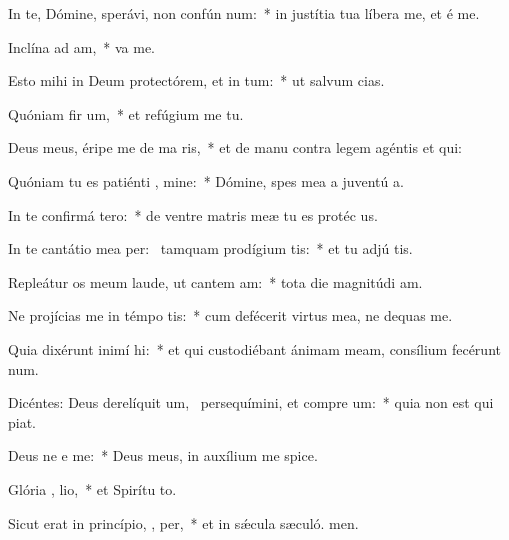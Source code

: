 \item In te, Dómine, sperávi, non confún  num:~* in justítia tua líbera me, et é me.
\item Inclína ad   am,~*  va me.
\item Esto mihi in Deum protectórem, et in  tum:~* ut salvum  cias.
\item Quóniam fir um,~* et refúgium me  tu.
\item Deus meus, éripe me de ma ris,~* et de manu contra legem agéntis et qui:
\item Quóniam tu es patiénti , mine:~* Dómine, spes mea a juventú a.
\item In te confirmá   tero:~* de ventre matris meæ tu es protéc us.
\item In te cantátio mea per:~\pscross{} tamquam prodígium   tis:~* et tu adjú tis.
\item Repleátur os meum laude, ut cantem  am:~* tota die magnitúdi am.
\item Ne projícias me in témpo tis:~* cum defécerit virtus mea, ne dequas me.
\item Quia dixérunt inimí  hi:~* et qui custodiébant ánimam meam, consílium fecérunt  num.
\item Dicéntes: Deus derelíquit um,~\pscross{} persequímini, et compre um:~* quia non est qui piat.
\item Deus ne e  me:~* Deus meus, in auxílium me spice.
\item Glória ,  lio,~* et Spirítu to.
\item Sicut erat in princípio,  ,  per,~* et in sǽcula sæculó. men.
